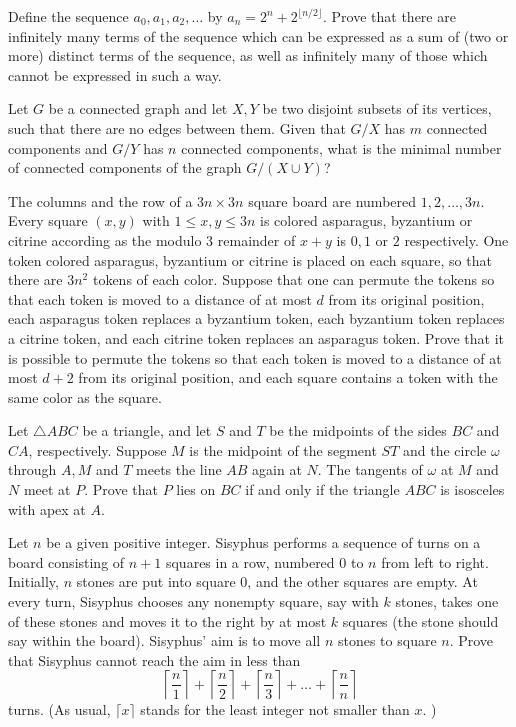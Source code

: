 \documentclass[11pt]{scrartcl}
\begin{document}
\begin{problem}[8609709793627283757]
	Define the sequence $a_0,a_1,a_2,\hdots$ by $a_n=2^n+2^{\lfloor n/2\rfloor}$. Prove that there are infinitely many terms of the sequence which can be expressed as a sum of (two or more) distinct terms of the sequence, as well as infinitely many of those which cannot be expressed in such a way.
\end{problem}
\begin{problem}[8612979541975584705]
	Let $G$ be a connected graph and let $X, Y$ be two disjoint subsets of its vertices, such that there are no edges between them. Given that $G/X$ has $m$ connected components and $G/Y$ has $n$ connected components, what is the minimal number of connected components of the graph $G/(X \cup Y)$?
\end{problem}
\begin{problem}[8617608868051245066]
	The columns and the row of a $3n \times 3n$ square board are numbered $1,2,\ldots ,3n$. Every square $(x,y)$ with $1 \leq x,y \leq 3n$ is colored asparagus, byzantium or citrine according as the modulo $3$ remainder of $x+y$ is $0,1$ or $2$ respectively. One token colored asparagus, byzantium or citrine is placed on each square, so that there are $3n^2$ tokens of each color.
Suppose that one can permute the tokens so that each token is moved to a distance of at most $d$ from its original position, each asparagus token replaces a byzantium token, each byzantium token replaces a citrine token, and each citrine token replaces an asparagus token. Prove that it is possible to permute the tokens so that each token is moved to a distance of at most $d+2$ from its original position, and each square contains a token with the same color as the square.
\end{problem}
\begin{problem}[8639636622304457736]
Let $\triangle ABC$ be a triangle, and let $S$ and $T$ be the midpoints of the sides $BC$ and $CA$, respectively. Suppose $M$ is the midpoint of the segment $ST$ and the circle $\omega$ through $A, M$ and $T$ meets the line $AB$ again at $N$. The tangents of $\omega$ at $M$ and $N$ meet at $P$. Prove that $P$ lies on $BC$ if and only if the triangle $ABC$ is isosceles with apex at $A$.
\end{problem}
\begin{problem}[8670333331361701457]
	Let $n$ be a given positive integer. Sisyphus performs a sequence of turns on a board consisting of $n + 1$ squares in a row, numbered $0$ to $n$ from left to right. Initially, $n$ stones are put into square $0$, and the other squares are empty. At every turn, Sisyphus chooses any nonempty square, say with $k$ stones, takes one of these stones and moves it to the right by at most $k$ squares (the stone should say within the board). Sisyphus' aim is to move all $n$ stones to square $n$.
Prove that Sisyphus cannot reach the aim in less than
\[ \left \lceil \frac{n}{1} \right \rceil + \left \lceil \frac{n}{2} \right \rceil + \left \lceil \frac{n}{3} \right \rceil + \dots + \left \lceil \frac{n}{n} \right \rceil \]turns. (As usual, $\lceil x \rceil$ stands for the least integer not smaller than $x$. )
\end{problem}
\end{document}

